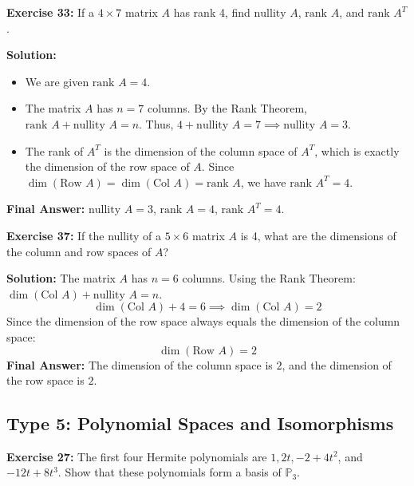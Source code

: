 \documentclass[12pt]{article}
\begin{document}
\textbf{Exercise 33:} If a $4 \times 7$ matrix $A$ has rank 4, find $\text{nullity } A$, $\text{rank } A$, and $\text{rank } A^T$.

\textbf{Solution:}
\begin{itemize}
    \item We are given $\text{rank } A = 4$.
    \item The matrix $A$ has $n = 7$ columns. By the Rank Theorem, $\text{rank } A + \text{nullity } A = n$. Thus, $4 + \text{nullity } A = 7 \implies \text{nullity } A = 3$.
    \item The rank of $A^T$ is the dimension of the column space of $A^T$, which is exactly the dimension of the row space of $A$. Since $\dim(\text{Row } A) = \dim(\text{Col } A) = \text{rank } A$, we have $\text{rank } A^T = 4$.
\end{itemize}
\textbf{Final Answer:} $\text{nullity } A = 3$, $\text{rank } A = 4$, $\text{rank } A^T = 4$.

\vspace{0.5cm}
\textbf{Exercise 37:} If the nullity of a $5 \times 6$ matrix $A$ is 4, what are the dimensions of the column and row spaces of $A$?

\textbf{Solution:}
The matrix $A$ has $n = 6$ columns.
Using the Rank Theorem: $\dim(\text{Col } A) + \text{nullity } A = n$.
\[ \dim(\text{Col } A) + 4 = 6 \implies \dim(\text{Col } A) = 2 \]
Since the dimension of the row space always equals the dimension of the column space:
\[ \dim(\text{Row } A) = 2 \]
\textbf{Final Answer:} The dimension of the column space is $2$, and the dimension of the row space is $2$.

\subsection{Type 5: Polynomial Spaces and Isomorphisms}

\textbf{Exercise 27:} The first four Hermite polynomials are $1, 2t, -2+4t^2$, and $-12t+8t^3$. Show that these polynomials form a basis of $\mathbb{P}_3$.
\end{document}
